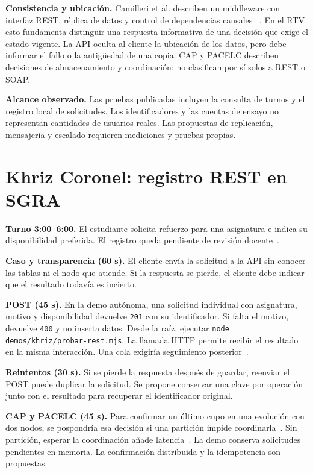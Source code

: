 \documentclass[10pt,a4paper,twocolumn]{article}
\begin{document}
\textbf{Consistencia y ubicación.} Camilleri et al. describen un middleware
con interfaz REST, réplica de datos y control de dependencias causales
~\cite{camilleri_horizontally_2024}. En el RTV esto fundamenta distinguir una
respuesta informativa de una decisión que exige el estado vigente.
La API oculta al cliente la ubicación de los datos, pero debe informar el
fallo o la antigüedad de una copia. CAP y PACELC describen decisiones de
almacenamiento y coordinación; no clasifican por sí solos a REST o SOAP.

\textbf{Alcance observado.} Las pruebas publicadas incluyen la consulta de
turnos y el registro local de solicitudes. Los identificadores y las cuentas de
ensayo no representan cantidades de usuarios reales. Las propuestas de
replicación, mensajería y escalado requieren mediciones y pruebas propias.

\section{Khriz Coronel: registro REST en SGRA}
\textbf{Turno 3:00--6:00.} El estudiante solicita refuerzo para una asignatura e indica su disponibilidad preferida. El registro queda pendiente de revisión docente~\cite{sgra-rf01-khriz}.

\textbf{Caso y transparencia (60 s).} El cliente envía la solicitud a la API sin conocer las tablas ni el nodo que atiende. Si la respuesta se pierde, el cliente debe indicar que el resultado todavía es incierto.

\textbf{POST (45 s).} En la demo autónoma, una solicitud individual con asignatura, motivo y disponibilidad devuelve \texttt{201} con su identificador. Si falta el motivo, devuelve \texttt{400} y no inserta datos. Desde la raíz, ejecutar \texttt{node demos/khriz/probar-rest.mjs}. La llamada HTTP permite recibir el resultado en la misma interacción. Una cola exigiría seguimiento posterior~\cite{kazanavicius-comunicacion-2023-khriz}.

\textbf{Reintentos (30 s).} Si se pierde la respuesta después de guardar, reenviar el POST puede duplicar la solicitud. Se propone conservar una clave por operación junto con el resultado para recuperar el identificador original.

\textbf{CAP y PACELC (45 s).} Para confirmar un último cupo en una evolución con dos nodos, se pospondría esa decisión si una partición impide coordinarla~\cite{gilbert-lynch-cap-khriz}. Sin partición, esperar la coordinación añade latencia~\cite{abadi-pacelc-khriz}. La demo conserva solicitudes pendientes en memoria. La confirmación distribuida y la idempotencia son propuestas.
\end{document}
